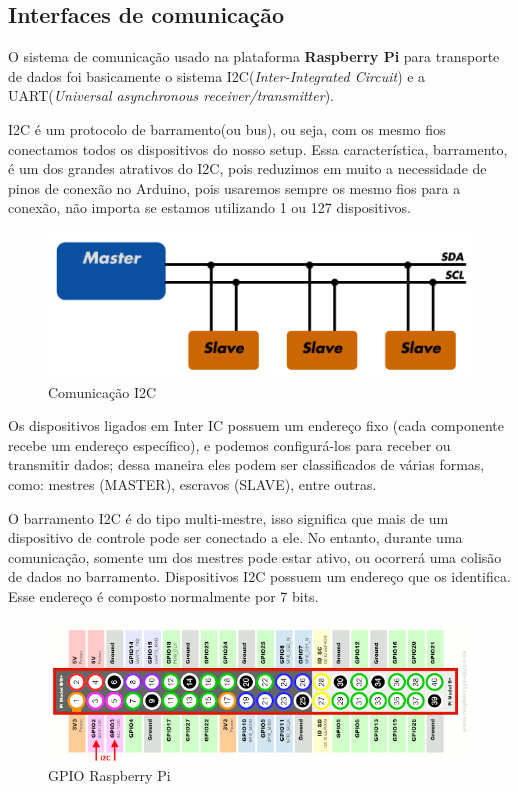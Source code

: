 \subsection{Interfaces de comunicação}

O sistema de comunicação usado na plataforma \textbf{Raspberry Pi} para transporte de dados foi basicamente o sistema I2C(\textit{Inter-Integrated Circuit}) e a UART(\textit{Universal asynchronous receiver/transmitter}).

I2C é um protocolo de barramento(ou bus), ou seja, com os mesmo fios conectamos todos os dispositivos do nosso setup. Essa característica, barramento, é um dos grandes atrativos do I2C, pois reduzimos em muito a necessidade de pinos de conexão no Arduino, pois usaremos sempre os mesmo fios para a conexão, não importa se estamos utilizando 1 ou 127 dispositivos.\cite{I2C}

\begin{figure}[!htb]
	\centering
	\includegraphics[scale=0.5]{figuras/8.png} 
	\caption{Comunicação I2C}
	\label{Rotulo}
\end{figure}

Os dispositivos ligados em Inter IC possuem um endereço fixo (cada componente recebe um endereço específico), e podemos configurá-los para receber ou transmitir dados; dessa maneira eles podem ser classificados de várias formas, como: mestres (MASTER), escravos (SLAVE), entre outras.\cite{I2C}

O barramento I2C é do tipo multi-mestre, isso significa que mais de um dispositivo de controle pode ser conectado a ele. No entanto, durante uma comunicação, somente um dos mestres pode estar ativo, ou ocorrerá uma colisão de dados no barramento. Dispositivos I2C possuem um endereço que os identifica. Esse endereço é composto normalmente por 7 bits. \cite{I2C}

\begin{figure}[!htb]
	\centering
	\includegraphics[scale=0.5]{figuras/9.png} 
	\caption{GPIO Raspberry Pi}
	\label{Rotulo}
\end{figure}

